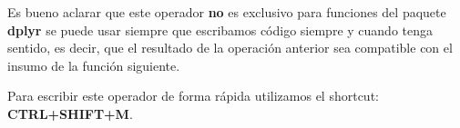 \documentclass[
  12pt,
]{book}
\begin{document}
Es bueno aclarar que este operador \textbf{no} es exclusivo para funciones del paquete \textbf{dplyr} se puede usar siempre que escribamos código siempre y cuando tenga sentido, es decir, que el resultado de la operación anterior sea compatible con el insumo de la función siguiente.

Para escribir este operador de forma rápida utilizamos el shortcut: \textbf{CTRL+SHIFT+M}.
\end{document}
